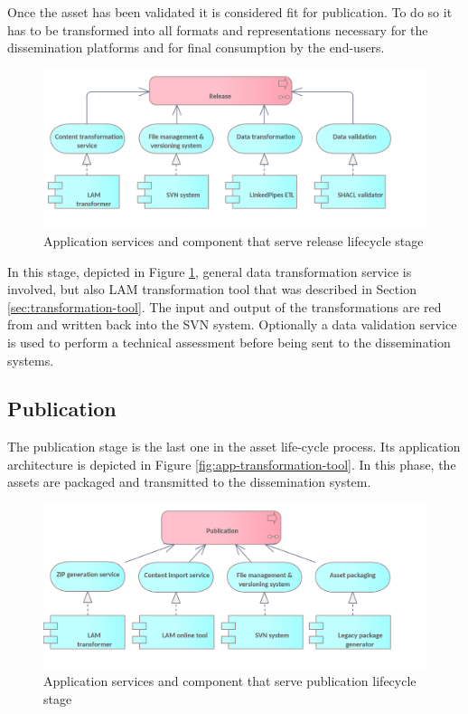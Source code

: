 	Once the asset has been validated it is considered fit for publication. To do so it has to be transformed into all formats and representations necessary for the dissemination platforms and for final consumption by the end-users. 
	
	 \begin{figure}[!h]
		\centering
		\includegraphics[width=.8\textwidth]{images/application/lifecycle/Release.png}
		\caption{Application services and component that serve release lifecycle stage}
		\label{fig:app-release}
	\end{figure}

	In this stage, depicted in Figure \ref{fig:app-release}, general data transformation service is involved, but also LAM transformation tool that was described in Section \ref{sec:transformation-tool}. The input and output of the transformations are red from and written back into the SVN system. Optionally a data validation service is used to perform a technical assessment before being sent to the dissemination systems.
	
	\subsection{Publication}
	\label{sec:publication}
	
	The publication stage is the last one in the asset life-cycle process. Its application
architecture is depicted in Figure \ref{fig:app-transformation-tool}.
	In this phase, the assets are packaged and transmitted to the dissemination system. 
	
	 \begin{figure}[!h]
		\centering
		\includegraphics[width=.8\textwidth]{images/application/lifecycle/Publication.png}
		\caption{Application services and component that serve publication lifecycle stage}
		\label{fig:app-publication}
	\end{figure}

